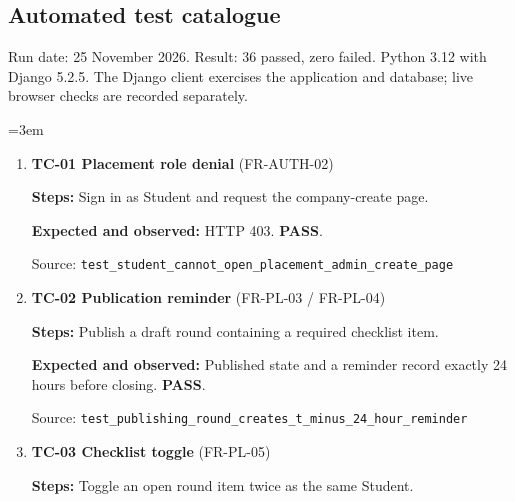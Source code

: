 \subsection*{Automated test catalogue}

Run date: 25 November 2026. Result: 36 passed, zero failed. Python 3.12 with Django 5.2.5. The Django client exercises the application and database; live browser checks are recorded separately.

\begingroup\raggedright\emergencystretch=3em

\begin{enumerate}

\item \begin{minipage}[t]{\linewidth}\textbf{TC-01 Placement role denial } (FR-AUTH-02)\par

\textbf{Steps:} Sign in as Student and request the company-create page.\par

\textbf{Expected and observed:} HTTP 403. \textbf{PASS}.\par

{\footnotesize Source: \nolinkurl{test_student_cannot_open_placement_admin_create_page}}\end{minipage}

\item \begin{minipage}[t]{\linewidth}\textbf{TC-02 Publication reminder } (FR-PL-03 / FR-PL-04)\par

\textbf{Steps:} Publish a draft round containing a required checklist item.\par

\textbf{Expected and observed:} Published state and a reminder record exactly 24 hours before closing. \textbf{PASS}.\par

{\footnotesize Source: \nolinkurl{test_publishing_round_creates_t_minus_24_hour_reminder}}\end{minipage}

\item \begin{minipage}[t]{\linewidth}\textbf{TC-03 Checklist toggle } (FR-PL-05)\par

\textbf{Steps:} Toggle an open round item twice as the same Student.\par


\end{minipage}
\end{enumerate}
